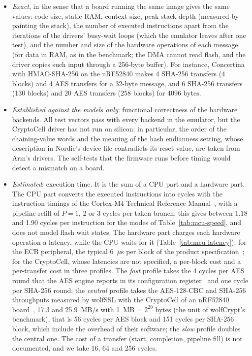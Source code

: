 \begin{itemize}
\item \emph{Exact}, in the sense that a board running the same image gives
the same values: code size, static RAM, context size, peak stack depth
(measured by painting the stack), the number of executed instructions apart
from the iterations of the drivers' busy-wait loops (which the emulator
leaves after one test), and the number and size of the hardware operations
of each message (for data in RAM, as in the benchmark; the DMA cannot read
flash, and the driver copies such input through a 256-byte buffer). For
instance, Concertina with HMAC-SHA-256 on the nRF52840 makes 4 SHA-256 transfers
(4 blocks) and 4 AES transfers for a
32-byte message, and 6 SHA-256 transfers
(130 blocks) and 20 AES transfers
(258 blocks) for 4096 bytes.
\item \emph{Established against the models only}: functional
correctness of the hardware backends. All test vectors pass with every
backend in the emulator, but the CryptoCell driver has not run on silicon;
in particular, the order of the chaining-value words and the meaning of the
hash endianness setting, whose description in Nordic's device file
contradicts its reset value, are taken from Arm's drivers. The self-tests
that the firmware runs before timing would detect a mismatch on a board.
\item \emph{Estimated}: execution time. It is the sum of a CPU part and a
hardware part. The CPU part converts the executed instructions into cycles
with the instruction timings of the Cortex-M4 Technical Reference
Manual~\cite{armCortexM4TRM},
with a pipeline refill of $P = 1$, 2 or 3 cycles per taken branch; this
gives between 1.18 and 1.90 cycles per instruction for the
modes of Table~\ref{tab:mcu-speed}, and does not model flash wait states. The
hardware part charges each hardware operation a latency, while the CPU waits
for it (Table~\ref{tab:mcu-latency}): for the ECB peripheral, the typical
6~$\mu$s per block of the product specification~\cite{nrf52832ecb}; for the CryptoCell, whose
latencies are not specified, a per-block cost and a per-transfer cost in
three profiles. The \emph{fast} profile takes the 4 cycles per AES round
that the AES engine reports in its configuration
register~\cite{nrf52840cryptocell} and one cycle per SHA-256 round; the
\emph{central} profile takes the AES-128-CBC and SHA-256 throughputs
measured by wolfSSL with the CryptoCell of an nRF52840
board~\cite{wolfSSLCC310}, 17.3 and 25.9~MB/s with 1~MB = $2^{20}$ bytes
(the unit of wolfCrypt's benchmark), that is 56 cycles per AES block and
151 cycles per SHA-256 block, which include the overhead of their
software; the \emph{slow} profile doubles the central one. The cost of a
transfer (start, completion, pipeline fill) is not documented, and we take
16, 64 and 256 cycles.
\end{itemize}
